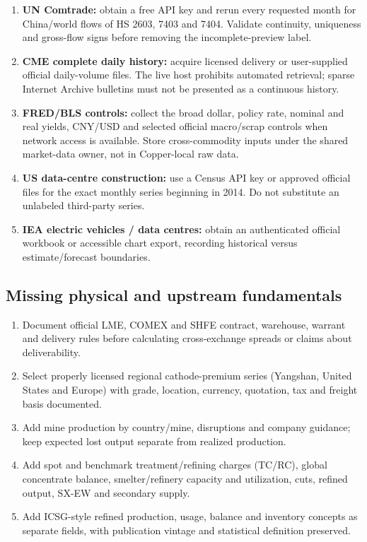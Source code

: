 \documentclass[11pt,a4paper]{article}
\begin{document}
\begin{enumerate}[leftmargin=*]
  \item \textbf{UN Comtrade:} obtain a free API key and rerun every requested month for China/world
        flows of HS 2603, 7403 and 7404. Validate continuity, uniqueness and gross-flow signs before
        removing the incomplete-preview label.
  \item \textbf{CME complete daily history:} acquire licensed delivery or user-supplied official
        daily-volume files. The live host prohibits automated retrieval; sparse Internet Archive
        bulletins must not be presented as a continuous history.
  \item \textbf{FRED/BLS controls:} collect the broad dollar, policy rate, nominal and real yields,
        CNY/USD and selected official macro/scrap controls when network access is available. Store
        cross-commodity inputs under the shared market-data owner, not in Copper-local raw data.
  \item \textbf{US data-centre construction:} use a Census API key or approved official files for
        the exact monthly series beginning in 2014. Do not substitute an unlabeled third-party series.
  \item \textbf{IEA electric vehicles / data centres:} obtain an authenticated official workbook
        or accessible chart export, recording historical versus estimate/forecast boundaries.
\end{enumerate}

\subsection{Missing physical and upstream fundamentals}

\begin{enumerate}[leftmargin=*]
  \item Document official LME, COMEX and SHFE contract, warehouse, warrant and delivery rules before
        calculating cross-exchange spreads or claims about deliverability.
  \item Select properly licensed regional cathode-premium series (Yangshan, United States and
        Europe) with grade, location, currency, quotation, tax and freight basis documented.
  \item Add mine production by country/mine, disruptions and company guidance; keep expected lost
        output separate from realized production.
  \item Add spot and benchmark treatment/refining charges (TC/RC), global concentrate balance,
        smelter/refinery capacity and utilization, cuts, refined output, SX-EW and secondary supply.
  \item Add ICSG-style refined production, usage, balance and inventory concepts as separate fields,
        with publication vintage and statistical definition preserved.
\end{enumerate}
\end{document}
